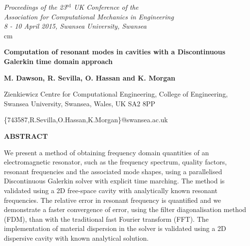 \documentclass[times,11pt]{ACME2015article}
\begin{document}
\pagestyle{empty}

\begin{flushright}
{\fontsize{8}{10}
\it Proceedings of the 23$^\mathrm{rd}$ UK Conference of the\\
Association for Computational Mechanics in Engineering\\
8 - 10 April 2015, Swansea University, Swansea\\}  cm
\end{flushright}

\begin{center}
{\fontsize{14}{20}\bf Computation of resonant modes in cavities with a Discontinuous Galerkin time domain approach
}\end{center}


\begin{center}
\textbf{M. Dawson, R. Sevilla, O. Hassan and K. Morgan}\\
\end{center}

\begin{center}
{\fontsize{10}{12}
Zienkiewicz Centre for Computational Engineering, College of Engineering, Swansea University, Swansea, Wales, UK SA2 8PP\\
}\end{center}

\begin{center}
\{743587,R.Sevilla,O.Hassan,K.Morgan\}@swansea.ac.uk\\
\end{center}
%
\begin{center}
\textbf{ABSTRACT}\\[1mm]
\end{center}
%

\begin{normalsize}
We present a method of obtaining frequency domain quantities of an electromagnetic resonator, such as the frequency spectrum, quality factors, resonant frequencies and the associated mode shapes, using a parallelised Discontinuous Galerkin solver with explicit time marching. The method is validated using a 2D free-space cavity with analytically known resonant frequencies. The relative error in resonant frequency is quantified and we demonstrate a faster convergence of error, using the filter diagonalisation method (FDM), than with the traditional fast Fourier transform (FFT). The implementation of material dispersion in the solver is validated using a 2D dispersive cavity with known analytical solution.
\end{normalsize}
\end{document}
